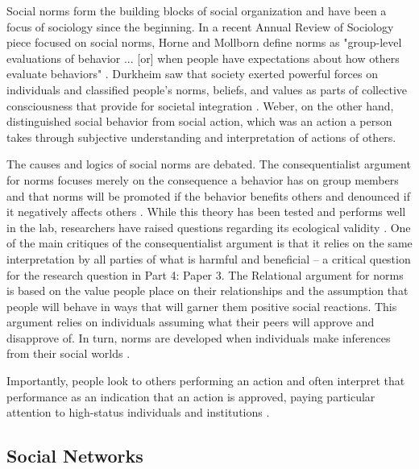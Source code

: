 Social norms form the building blocks of social organization and have
been a focus of sociology since the beginning. In a recent Annual Review
of Sociology piece focused on social norms, Horne and Mollborn define
norms as "group-level evaluations of behavior ... [or] when people
have expectations about how others evaluate behaviors" \citeyearpar[p. 468-69]{horneNormsIntegratedFramework2020}. Durkheim saw that society exerted powerful
forces on individuals and classified people's norms, beliefs, and values
as parts of collective consciousness that provide for societal
integration \citep{durkheimDivisionLaborSociety1933, durkheimSuicide1897}.
Weber, on the other hand, distinguished social behavior from social action,
which was an action a person takes through subjective understanding and
interpretation of actions of others. %

The causes and logics of social norms are debated. The consequentialist
argument for norms focuses merely on the consequence a behavior has on
group members and that norms will be promoted if the behavior benefits
others and denounced if it negatively affects others \citep{ullmannmargalitEmergenceNorms1977}.
 While this theory has been tested and performs well in the lab,
researchers have raised questions regarding its ecological validity
\citep{horneNormsIntegratedFramework2020}. One of the main critiques of the
consequentialist argument is that it relies on the same interpretation
by all parties of what is harmful and beneficial -- a critical question
for the research question in Part 4: Paper 3. The Relational argument %
for norms is based on the value people place on their relationships and
the assumption that people will behave in ways that will garner them
positive social reactions. This argument relies on individuals assuming
what their peers will approve and disapprove of. In turn, norms are
developed when individuals make inferences from their social worlds
\citep{fryeCulturalMeaningsAggregation2017}.

Importantly, people look to others performing an action and often
interpret that performance as an indication that an action is approved,
paying particular attention to high-status individuals and institutions
\citep{robalinoPeerEffectsAdolescent2018, tankardEffectSupremeCourt2017}.

\subsection{Social Networks}


